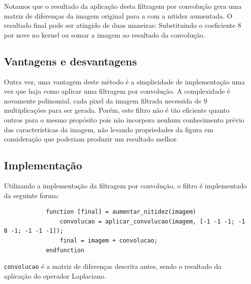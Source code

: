 \documentclass[brazil,times]{abnt}
\begin{document}
		Notamos que o resultado da aplicação desta filtragem por convolução gera uma matriz de diferenças da imagem original para a com a nitidez aumentada. O resultado final pode ser atingido de duas maneiras: Substituindo o coeficiente 8 por nove no kernel ou somar a imagem ao resultado da convolução. 
		
		\subsection{Vantagens e desvantagens}
			Outra vez, uma vantagem deste método é a simplicidade de implementação uma vez que haja como aplicar uma filtragem por convolução. A complexidade é novamente polinomial, cada pixel da imagem filtrada necessida de 9 multiplicações para ser gerada. Porém, este filtro não é tão eficiente quanto outros para o mesmo propósito pois não incorpora nenhum conhecimento prévio das características da imagem, não levando propriedades da figura em consideração que poderiam produzir um resultado melhor.
			
		\subsection{Implementação}
			Utilizando a implementação da filtragem por convolução, o filtro é implementado da seguinte forma:
			
			\begin{lstlisting}
			function [final] = aumentar_nitidez(imagem)
				convolucao = aplicar_convolucao(imagem, [-1 -1 -1; -1 8 -1; -1 -1 -1]);
			    final = imagem + convolucao;
			endfunction
			\end{lstlisting}
			
			\texttt{convolucao} é a matriz de diferenças descrita antes, sendo o resultado da aplicação do operador Laplaciano.
		
\end{document}
